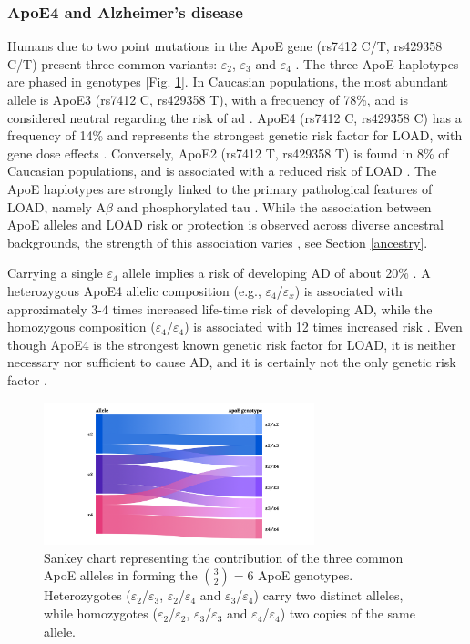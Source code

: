 \documentclass{amsart}
\begin{document}
\subsubsection{ApoE4 and Alzheimer's disease}
Humans due to two point mutations in the ApoE gene (rs7412 C/T, rs429358 C/T) present three common variants: $\varepsilon_2$, $\varepsilon_3$ and $\varepsilon_4$ \cite{Husain2021APOETherapeutics, Yang2023ApolipoproteinDisease}. The three ApoE haplotypes are phased in genotypes [Fig. \ref{fig1}]. In Caucasian populations, the most abundant allele is ApoE3 (rs7412 C, rs429358 T), with a frequency of 78\%, and is considered neutral regarding the risk of \acrshort{ad} \cite{Liu2013ApolipoproteinTherapy}. ApoE4 (rs7412 C, rs429358 C) has a frequency of 14\% and represents the strongest genetic risk factor for LOAD, with gene dose effects \cite{Strittmatter1993ApolipoproteinDisease}. Conversely, ApoE2 (rs7412 T, rs429358 T) is found in 8\% of Caucasian populations, and is associated with a reduced risk of LOAD \cite{Liu2013ApolipoproteinTherapy}. The ApoE haplotypes are strongly linked to the primary pathological features of LOAD, namely A$\beta$ and phosphorylated tau \cite{Deming2017Genome-wideModifiers}. While the association between ApoE alleles and LOAD risk or protection is observed across diverse ancestral backgrounds, the strength of this association varies \cite{Belloy2019AForward, Farrer1997EffectsMeta-analysis}, see Section \ref{ancestry}.

Carrying a single $\varepsilon_4$ allele implies a risk of developing AD of about 20\% \cite{Bookheimer2009APOE4GA}. A heterozygous ApoE4 allelic composition (e.g., $\varepsilon_4$/$\varepsilon_x$) is associated with approximately 3-4 times increased life-time risk of developing AD, while the homozygous composition ($\varepsilon_4$/$\varepsilon_4$) is associated with 12 times increased risk \cite{Kim2009TheRO}. Even though ApoE4 is the strongest known genetic risk factor for LOAD, it is neither necessary nor sufficient to cause AD, and it is certainly not the only genetic risk factor \cite{SerranoPozo2019IsAD}.

\begin{figure}[H]
  \includegraphics[width=0.7\textwidth]{figures/ApoE@2x.png}
    \caption{Sankey chart representing the contribution of the three common ApoE alleles in forming the $\binom{3}{2} = 6$ ApoE genotypes. Heterozygotes ($\varepsilon_2$/$\varepsilon_3$,  $\varepsilon_2$/$\varepsilon_4$ and $\varepsilon_3$/$\varepsilon_4$) carry two distinct alleles, while homozygotes ($\varepsilon_2$/$\varepsilon_2$, $\varepsilon_3$/$\varepsilon_3$ and $\varepsilon_4$/$\varepsilon_4$) two copies of the same allele.}
  \label{fig1}
\end{figure}
\end{document}

